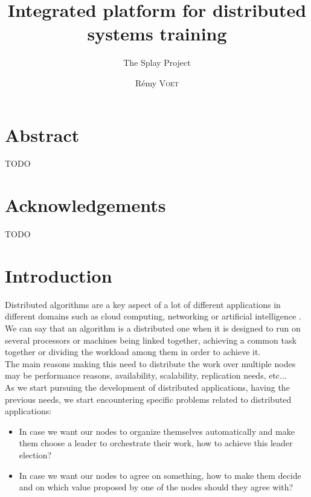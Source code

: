 \documentclass{eplmastersthesis}
\title{Integrated platform for distributed systems training}
\subtitle{The Splay Project}
\author{Rémy \textsc{Voet}}
\begin{document}
  \maketitle

  \chapter*{Abstract}
  {\color{red} TODO}

  \chapter*{Acknowledgements}
  {\color{red} TODO}

  \tableofcontents

  \chapter{Introduction}



    Distributed algorithms are a key aspect of a lot of different
    applications in different domains such as cloud computing, networking
    or artificial intelligence \cite{DistributedArtificialIntelligence}.\\
    We can say that an algorithm is a distributed one when it is designed to
    run on several processors or machines being linked together, achieving
    a common task together or dividing the workload among them in order to
    achieve it.\\
    The main reasons making this need to distribute the work over multiple
    nodes may be performance reasons, availability, scalability, replication
    needs, etc...\\
    As we start pursuing the development of distributed applications, having
    the previous needs, we start encountering specific problems related to
    distributed applications:
    \begin{itemize}
      \item In case we want our nodes to organize themselves automatically and
      make them choose a leader to orchestrate their work, how to achieve
      this leader election?
      \item In case we want our nodes to agree on something, how to make
      them decide and on which value proposed by one of the nodes should they
      agree with?
    \end{itemize}
\end{document}

